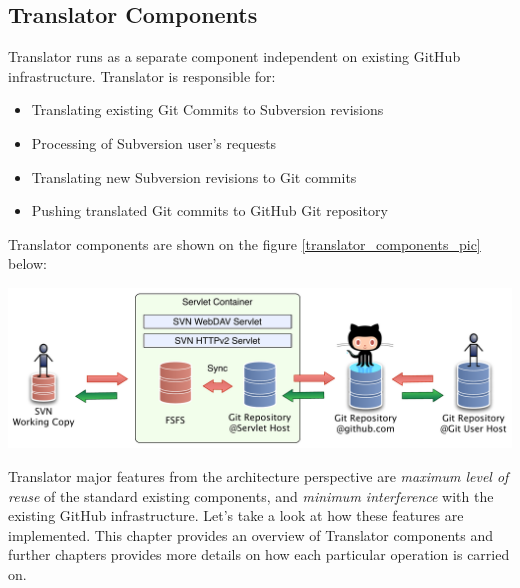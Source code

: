 \subsection{Translator Components}
\renewcommand{\figurename}{Figure}

Translator runs as a separate component independent on existing GitHub infrastructure. Translator is responsible for:
\begin{itemize}
  \item Translating existing Git Commits to Subversion revisions
  \item Processing of Subversion user's requests
  \item Translating new Subversion revisions to Git commits
  \item Pushing translated Git commits to GitHub Git repository
\end{itemize}
Translator components are shown on the figure \ref{translator_components_pic} below:
\begin{center}
\includegraphics[width=\textwidth]{img/servlet/components_keep_github_safe.pdf}%
\label{translator_components_pic}%
\end{center}

Translator major features from the architecture perspective are \emph{maximum level of reuse} of the standard existing components, and \emph{minimum interference} with the existing GitHub infrastructure. 
Let's take a look at how these features are implemented. This chapter provides an overview of Translator components and further chapters provides more details on how each particular operation is carried on.

\label{srp}
